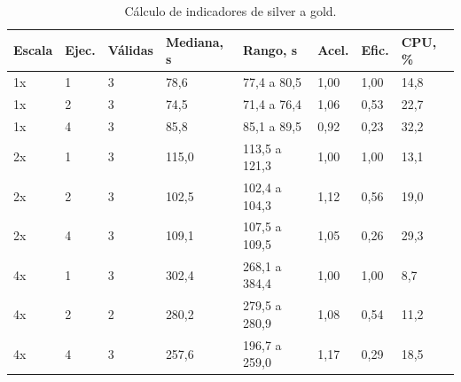 \begin{table}[H]
  \centering
  \footnotesize
  \setlength{\tabcolsep}{4pt}
  \renewcommand{\arraystretch}{1.05}
  \begin{tabular}{p{} p{} p{} p{} p{} p{} p{} p{}}
    \hline
    \textbf{Escala} & \textbf{Ejec.} & \textbf{Válidas} & \textbf{Mediana, s} & \textbf{Rango, s} & \textbf{Acel.} & \textbf{Efic.} & \textbf{CPU, \%} \\
    \hline
    1x & 1 & 3 & 78,6 & 77,4 a 80,5 & 1,00 & 1,00 & 14,8 \\
    1x & 2 & 3 & 74,5 & 71,4 a 76,4 & 1,06 & 0,53 & 22,7 \\
    1x & 4 & 3 & 85,8 & 85,1 a 89,5 & 0,92 & 0,23 & 32,2 \\
    2x & 1 & 3 & 115,0 & 113,5 a 121,3 & 1,00 & 1,00 & 13,1 \\
    2x & 2 & 3 & 102,5 & 102,4 a 104,3 & 1,12 & 0,56 & 19,0 \\
    2x & 4 & 3 & 109,1 & 107,5 a 109,5 & 1,05 & 0,26 & 29,3 \\
    4x & 1 & 3 & 302,4 & 268,1 a 384,4 & 1,00 & 1,00 & 8,7 \\
    4x & 2 & 2 & 280,2 & 279,5 a 280,9 & 1,08 & 0,54 & 11,2 \\
    4x & 4 & 3 & 257,6 & 196,7 a 259,0 & 1,17 & 0,29 & 18,5 \\
    \hline
  \end{tabular}
  \caption{Cálculo de indicadores de silver a gold.}
  \label{tab:anexo_benchmark_gold}
\end{table}

